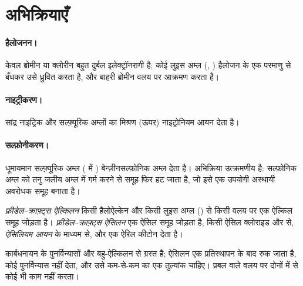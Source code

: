 \section{अभिक्रियाएँ}

\paragraph{हैलोजनन।} केवल ब्रोमीन या क्लोरीन बहुत दुर्बल इलेक्ट्रॉनरागी है; कोई लुइस अम्ल
(, ) हैलोजन के एक परमाणु से बँधकर उसे ध्रुवित करता है, और बाहरी
ब्रोमीन वलय पर आक्रमण करता है।

\paragraph{नाइट्रीकरण।} सांद्र नाइट्रिक और सल्फ़्यूरिक अम्लों का मिश्रण (ऊपर)
नाइट्रोनियम आयन देता है।

\paragraph{सल्फ़ोनीकरण।} धूमायमान सल्फ़्यूरिक अम्ल ( में ) बेन्ज़ीनसल्फ़ोनिक अम्ल देता है।
अभिक्रिया उत्क्रमणीय है: सल्फ़ोनिक अम्ल को तनु जलीय अम्ल में गर्म करने से
 समूह फिर हट जाता है, जो इसे एक उपयोगी अस्थायी अवरोधक समूह बनाता है।

\begin{definition}[फ़्रीडेल--क्राफ़्ट्स अभिक्रियाएँ]\label{def:b2:aromatic-substitution:friedel-crafts}
\emph{फ़्रीडेल--क्राफ़्ट्स ऐल्किलन} किसी हैलोऐल्केन और
किसी लुइस अम्ल () से किसी  वलय पर एक ऐल्किल समूह जोड़ता है।
\emph{फ़्रीडेल--क्राफ़्ट्स ऐसिलन} एक ऐसिल समूह
 जोड़ता है, किसी ऐसिल क्लोराइड और  से, \emph{ऐसिलियम आयन}
 के माध्यम से, और एक ऐरिल कीटोन देता है।
\end{definition}

\begin{proposition}[फ़्रीडेल--क्राफ़्ट्स अभिक्रियाओं की सीमाएँ]\label{prop:b2:aromatic-substitution:friedel-crafts-limits}
 कार्बधनायन के पुनर्विन्यासों और
बहु-ऐल्किलन से ग्रस्त है; ऐसिलन एक प्रतिस्थापन के बाद रुक जाता है, कोई पुनर्विन्यास नहीं देता, और उसे कम-से-कम
 का एक तुल्यांक चाहिए। प्रबल  वाले वलय पर दोनों में से कोई भी
काम नहीं करता।
\end{proposition}

